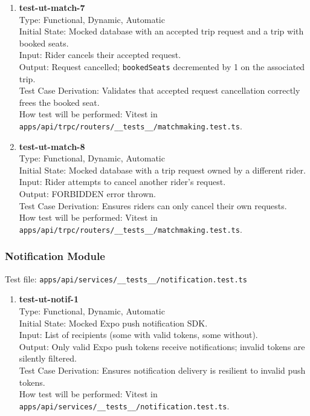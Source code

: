 \documentclass[12pt, titlepage]{article}
\begin{document}
\begin{enumerate}
\item \textbf{test-ut-match-7}\\
Type: Functional, Dynamic, Automatic\\
Initial State: Mocked database with an accepted trip request and a trip with booked seats.\\
Input: Rider cancels their accepted request.\\
Output: Request cancelled; \texttt{bookedSeats} decremented by 1 on the associated trip.\\
Test Case Derivation: Validates that accepted request cancellation correctly frees the booked seat.\\
How test will be performed: Vitest in \texttt{apps/api/trpc/routers/\_\_tests\_\_/matchmaking.test.ts}.\\

\item \textbf{test-ut-match-8}\\
Type: Functional, Dynamic, Automatic\\
Initial State: Mocked database with a trip request owned by a different rider.\\
Input: Rider attempts to cancel another rider's request.\\
Output: FORBIDDEN error thrown.\\
Test Case Derivation: Ensures riders can only cancel their own requests.\\
How test will be performed: Vitest in \texttt{apps/api/trpc/routers/\_\_tests\_\_/matchmaking.test.ts}.\\
\end{enumerate}

\subsubsection{Notification Module}

Test file: \texttt{apps/api/services/\_\_tests\_\_/notification.test.ts}

\begin{enumerate}
\item \textbf{test-ut-notif-1}\\
Type: Functional, Dynamic, Automatic\\
Initial State: Mocked Expo push notification SDK.\\
Input: List of recipients (some with valid tokens, some without).\\
Output: Only valid Expo push tokens receive notifications; invalid tokens are silently filtered.\\
Test Case Derivation: Ensures notification delivery is resilient to invalid push tokens.\\
How test will be performed: Vitest in \texttt{apps/api/services/\_\_tests\_\_/notification.test.ts}.\\
\end{enumerate}
\end{document}
